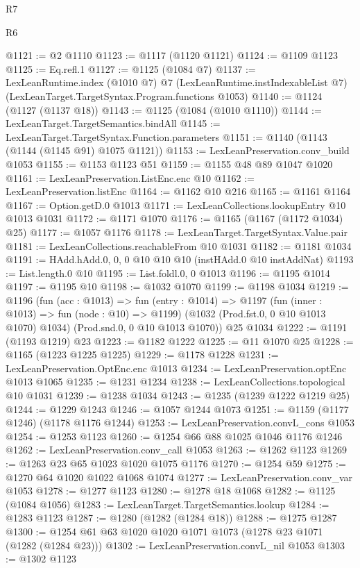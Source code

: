 \begin{lexlean}{R7}
\begin{lexlean}{R6}
\begin{coremodule}
{{{{{{{{{{{{{{{{{{{{@1121 := @2 @1110
@1123 := @1117 (@1120 @1121)
@1124 := @1109 @1123
@1125 := Eq.refl.{1}
@1127 := @1125 (@1084 @7)
@1137 := LexLeanRuntime.index
    (@1010 @7)
    @7
    (LexLeanRuntime.instIndexableList @7)
    (LexLeanTarget.TargetSyntax.Program.functions @1053)
@1140 := @1124 (@1127 (@1137 @18))
@1143 := @1125 (@1084 (@1010 @1110))
@1144 := LexLeanTarget.TargetSemantics.bindAll
@1145 := LexLeanTarget.TargetSyntax.Function.parameters
@1151 := @1140 (@1143 (@1144 (@1145 @91) @1075 @1121))
@1153 := LexLeanPreservation.conv_build @1053
@1155 := @1153 @1123 @51
@1159 := @1155 @48 @89 @1047 @1020
@1161 := LexLeanPreservation.ListEnc.enc @10
@1162 := LexLeanPreservation.listEnc
@1164 := @1162 @10 @216
@1165 := @1161 @1164
@1167 := Option.getD.{0} @1013
@1171 := LexLeanCollections.lookupEntry @10 @1013 @1031
@1172 := @1171 @1070
@1176 := @1165 (@1167 (@1172 @1034) @25)
@1177 := @1057 @1176
@1178 := LexLeanTarget.TargetSyntax.Value.pair
@1181 := LexLeanCollections.reachableFrom @10 @1031
@1182 := @1181 @1034
@1191 := HAdd.hAdd.{0, 0, 0} @10 @10 @10 (instHAdd.{0} @10 instAddNat)
@1193 := List.length.{0} @10
@1195 := List.foldl.{0, 0} @1013
@1196 := @1195 @1014
@1197 := @1195 @10
@1198 := @1032 @1070
@1199 := @1198 @1034
@1219 := @1196
    (fun (acc : @1013) =>
    fun (entry : @1014) =>
    @1197
      (fun (inner : @1013) => fun (node : @10) => @1199)
      (@1032 (Prod.fst.{0, 0} @10 @1013 @1070) @1034)
      (Prod.snd.{0, 0} @10 @1013 @1070))
    @25
    @1034
@1222 := @1191 (@1193 @1219) @23
@1223 := @1182 @1222
@1225 := @11 @1070 @25
@1228 := @1165 (@1223 @1225 @1225)
@1229 := @1178 @1228
@1231 := LexLeanPreservation.OptEnc.enc @1013
@1234 := LexLeanPreservation.optEnc @1013 @1065
@1235 := @1231 @1234
@1238 := LexLeanCollections.topological @10 @1031
@1239 := @1238 @1034
@1243 := @1235 (@1239 @1222 @1219 @25)
@1244 := @1229 @1243
@1246 := @1057 @1244 @1073
@1251 := @1159 (@1177 @1246) (@1178 @1176 @1244)
@1253 := LexLeanPreservation.convL_cons @1053
@1254 := @1253 @1123
@1260 := @1254 @66 @88 @1025 @1046 @1176 @1246
@1262 := LexLeanPreservation.conv_call @1053
@1263 := @1262 @1123
@1269 := @1263 @23 @65 @1023 @1020 @1075 @1176
@1270 := @1254 @59
@1275 := @1270 @64 @1020 @1022 @1068 @1074
@1277 := LexLeanPreservation.conv_var @1053
@1278 := @1277 @1123
@1280 := @1278 @18 @1068
@1282 := @1125 (@1084 @1056)
@1283 := LexLeanTarget.TargetSemantics.lookup
@1284 := @1283 @1123
@1287 := @1280 (@1282 (@1284 @18))
@1288 := @1275 @1287
@1300 := @1254 @61 @63 @1020 @1020 @1071 @1073 (@1278 @23 @1071 (@1282 (@1284 @23)))
@1302 := LexLeanPreservation.convL_nil @1053
@1303 := @1302 @1123
}}}}}}}}}}}}}}}}}}}}
\end{coremodule}
\end{lexlean}
\end{lexlean}
